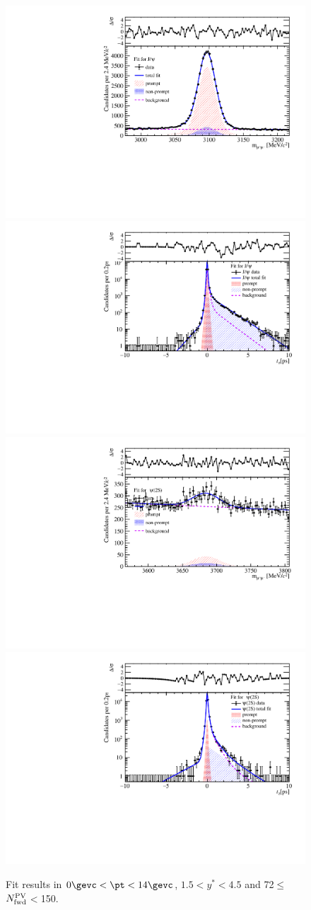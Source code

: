 \begin{figure}[H]
\begin{center}
\includegraphics[width=0.45\linewidth]{pdf/Pbp/FWorkdir/TwoDimFit/ProjMass/Jpsi_n5y1pt1.pdf}
\includegraphics[width=0.45\linewidth]{pdf/Pbp/FWorkdir/TwoDimFit/ProjTz/Jpsi_n5y1pt1.pdf}
\vspace*{-0.5cm}
\includegraphics[width=0.45\linewidth]{pdf/Pbp/FWorkdir/TwoDimFit/ProjMass/Psi2S_n5y1pt1.pdf}
\includegraphics[width=0.45\linewidth]{pdf/Pbp/FWorkdir/TwoDimFit/ProjTz/Psi2S_n5y1pt1.pdf}
\vspace*{-0.5cm}
\end{center}
\caption{Fit results in $0\gevc<\pt<14\gevc$, $1.5<y^*<4.5$ and 72$\leq$$N_{\rm fwd}^{\rm PV}$$<$150.}
\end{figure}



